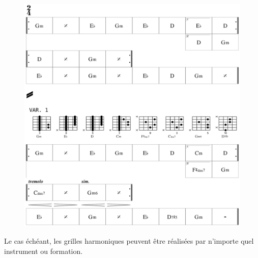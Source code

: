  \begin{figure}[H]
\begin{center}
\includegraphics[width=\textwidth]{img/dlc2}
\end{center}
\end{figure}
Le cas \'{e}ch\'{e}ant, les grilles harmoniques peuvent \^{e}tre r\'{e}alis\'{e}es par n'importe quel instrument ou formation.
 
